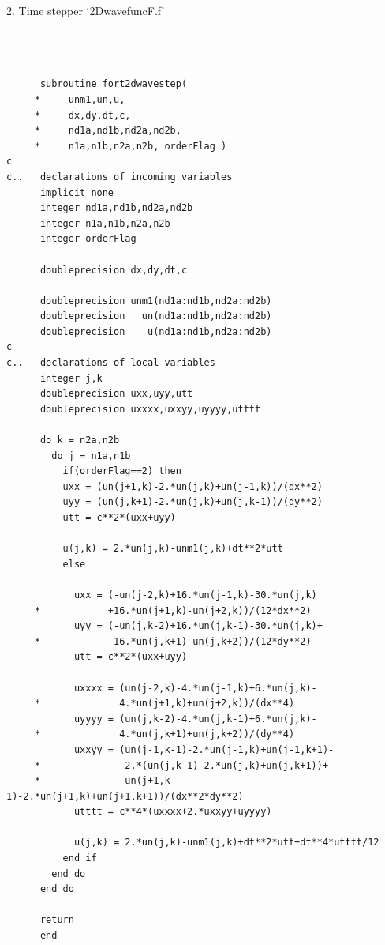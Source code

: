 2. Time stepper `2DwavefuncF.f'
\begin{lstlisting}[frame=single]
 


      subroutine fort2dwavestep(
     *     unm1,un,u,
     *     dx,dy,dt,c,
     *     nd1a,nd1b,nd2a,nd2b,
     *     n1a,n1b,n2a,n2b, orderFlag )
c
c..   declarations of incoming variables
      implicit none
      integer nd1a,nd1b,nd2a,nd2b
      integer n1a,n1b,n2a,n2b
      integer orderFlag

      doubleprecision dx,dy,dt,c
      
      doubleprecision unm1(nd1a:nd1b,nd2a:nd2b)
      doubleprecision   un(nd1a:nd1b,nd2a:nd2b)
      doubleprecision    u(nd1a:nd1b,nd2a:nd2b)
c
c..   declarations of local variables
      integer j,k
      doubleprecision uxx,uyy,utt
      doubleprecision uxxxx,uxxyy,uyyyy,utttt
      
      do k = n2a,n2b
        do j = n1a,n1b
          if(orderFlag==2) then
          uxx = (un(j+1,k)-2.*un(j,k)+un(j-1,k))/(dx**2)
          uyy = (un(j,k+1)-2.*un(j,k)+un(j,k-1))/(dy**2)
          utt = c**2*(uxx+uyy)
          
          u(j,k) = 2.*un(j,k)-unm1(j,k)+dt**2*utt
          else

            uxx = (-un(j-2,k)+16.*un(j-1,k)-30.*un(j,k)
     *            +16.*un(j+1,k)-un(j+2,k))/(12*dx**2)
            uyy = (-un(j,k-2)+16.*un(j,k-1)-30.*un(j,k)+
     *             16.*un(j,k+1)-un(j,k+2))/(12*dy**2)
            utt = c**2*(uxx+uyy)
			
            uxxxx = (un(j-2,k)-4.*un(j-1,k)+6.*un(j,k)-  
     *              4.*un(j+1,k)+un(j+2,k))/(dx**4)
            uyyyy = (un(j,k-2)-4.*un(j,k-1)+6.*un(j,k)-  
     *              4.*un(j,k+1)+un(j,k+2))/(dy**4)
            uxxyy = (un(j-1,k-1)-2.*un(j-1,k)+un(j-1,k+1)-
     *               2.*(un(j,k-1)-2.*un(j,k)+un(j,k+1))+ 
     *               un(j+1,k-1)-2.*un(j+1,k)+un(j+1,k+1))/(dx**2*dy**2)
            utttt = c**4*(uxxxx+2.*uxxyy+uyyyy)
			
            u(j,k) = 2.*un(j,k)-unm1(j,k)+dt**2*utt+dt**4*utttt/12
          end if
        end do
      end do
      
      return
      end
\end{lstlisting}

